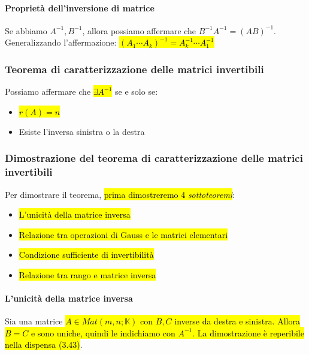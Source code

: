 \paragraph{Proprietà dell'inversione di matrice}\label{par:proprieta-inv-matrice}
Se abbiamo $A^{-1}, B^{-1}$, allora possiamo affermare che $B^{-1}A^{-1} = (AB)^{-1}$.
Generalizzando l'affermazione: \hl{$(A_1 \dotsm A_k)^{-1} = A_{k}^{-1} \dotsm A_1^{-1}$}

\subsubsection{Teorema di caratterizzazione delle matrici invertibili}
Possiamo affermare che \hl{$\exists A^{-1}$} se e solo se:
\begin{itemize}
    \item \hl{$r(A) = n$}
    \item Esiste l'inversa sinistra o la destra
\end{itemize}

\subsubsection{Dimostrazione del teorema di caratterizzazione delle matrici invertibili}
Per dimostrare il teorema, \hl{prima dimostreremo 4 \textit{sottoteoremi}}:
\begin{itemize}
    \item \hl{L'unicità della matrice inversa}
    \item \hl{Relazione tra operazioni di Gauss e le matrici elementari}
    \item \hl{Condizione sufficiente di invertibilità}
    \item \hl{Relazione tra rango e matrice inversa}
\end{itemize}

\paragraph{L'unicità della matrice inversa} Sia una matrice \hl{$A \in Mat(m,n;\mathbb{K})$
con $B, C$ inverse da destra e sinistra. Allora $B=C$ e sono uniche, quindi le 
indichiamo con $A^{-1}$. La dimostrazione è reperibile nella dispensa (3.43)}.

